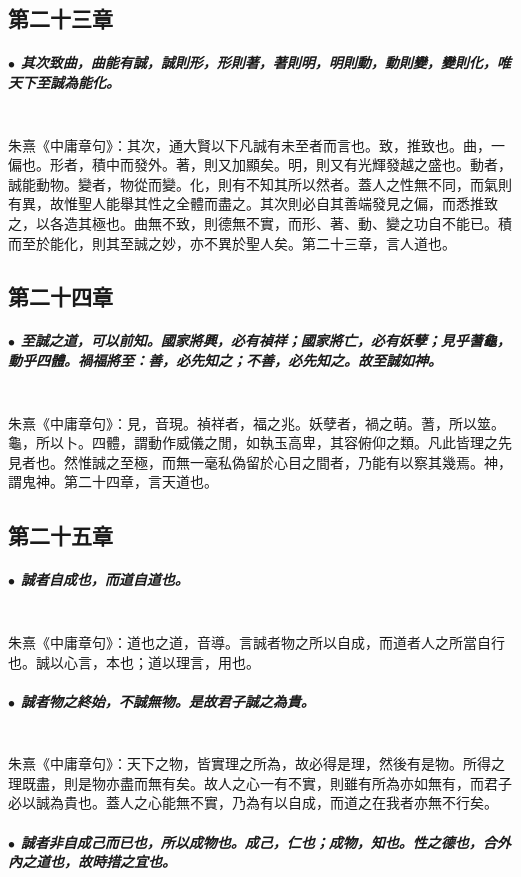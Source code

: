 \documentclass[hyperref, UTF8, 12pt, a4paper]{ctexrep}
\begin{document}
\newpage
\subsection{第二十三章}

\subparagraph{$\bullet$ 其次致曲，曲能有誠，誠則形，形則著，著則明，明則動，動則變，變則化，唯天下至誠為能化。} ~\\

朱熹《中庸章句》：其次，通大賢以下凡誠有未至者而言也。致，推致也。曲，一偏也。形者，積中而發外。著，則又加顯矣。明，則又有光輝發越之盛也。動者，誠能動物。變者，物從而變。化，則有不知其所以然者。蓋人之性無不同，而氣則有異，故惟聖人能舉其性之全體而盡之。其次則必自其善端發見之偏，而悉推致之，以各造其極也。曲無不致，則德無不實，而形、著、動、變之功自不能已。積而至於能化，則其至誠之妙，亦不異於聖人矣。第二十三章，言人道也。

\newpage
\subsection{第二十四章}

\subparagraph{$\bullet$ 至誠之道，可以前知。國家將興，必有禎祥；國家將亡，必有妖孽；見乎蓍龜，動乎四體。禍福將至：善，必先知之；不善，必先知之。故至誠如神。} ~\\

朱熹《中庸章句》：見，音現。禎祥者，福之兆。妖孽者，禍之萌。蓍，所以筮。龜，所以卜。四體，謂動作威儀之閒，如執玉高卑，其容俯仰之類。凡此皆理之先見者也。然惟誠之至極，而無一毫私偽留於心目之間者，乃能有以察其幾焉。神，謂鬼神。第二十四章，言天道也。

\newpage
\subsection{第二十五章}

\subparagraph{$\bullet$ 誠者自成也，而道自道也。} ~\\

朱熹《中庸章句》：道也之道，音導。言誠者物之所以自成，而道者人之所當自行也。誠以心言，本也；道以理言，用也。

\subparagraph{$\bullet$ 誠者物之終始，不誠無物。是故君子誠之為貴。} ~\\

朱熹《中庸章句》：天下之物，皆實理之所為，故必得是理，然後有是物。所得之理既盡，則是物亦盡而無有矣。故人之心一有不實，則雖有所為亦如無有，而君子必以誠為貴也。蓋人之心能無不實，乃為有以自成，而道之在我者亦無不行矣。

\subparagraph{$\bullet$ 誠者非自成己而已也，所以成物也。成己，仁也；成物，知也。性之德也，合外內之道也，故時措之宜也。} ~\\
\end{document}

